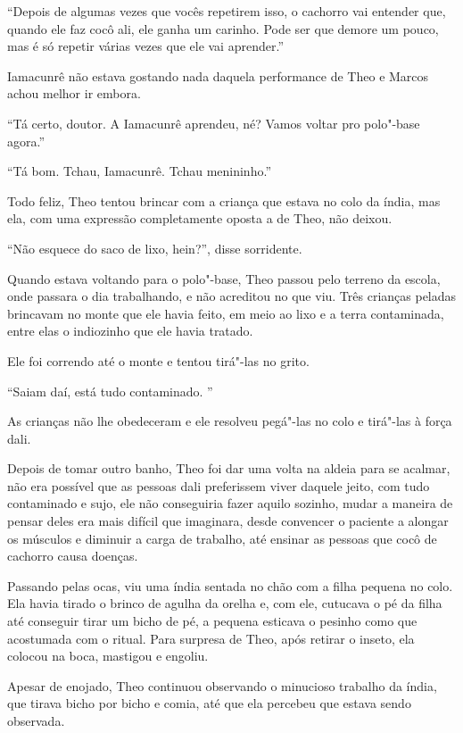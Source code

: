 ``Depois de algumas vezes que vocês repetirem isso, o cachorro vai
entender que, quando ele faz cocô ali, ele ganha um carinho. Pode ser
que demore um pouco, mas é só repetir várias vezes que ele vai
aprender.''

Iamacunrê não estava gostando nada daquela performance de Theo e Marcos
achou melhor ir embora.

``Tá certo, doutor. A Iamacunrê aprendeu, né? Vamos voltar pro polo"-base
agora.''

``Tá bom. Tchau, Iamacunrê. Tchau menininho.''

Todo feliz, Theo tentou brincar com a criança que estava no colo da
índia, mas ela, com uma expressão completamente oposta a de Theo, não
deixou.

``Não esquece do saco de lixo, hein?'', disse sorridente.

Quando estava voltando para o polo"-base, Theo passou pelo terreno da
escola, onde passara o dia trabalhando, e não acreditou no que viu. Três
crianças peladas brincavam no monte que ele havia feito, em meio ao lixo
e a terra contaminada, entre elas o indiozinho que ele havia tratado.

Ele foi correndo até o monte e tentou tirá"-las no grito.

``Saiam daí, está tudo contaminado. ''

As crianças não lhe obedeceram e ele resolveu pegá"-las no colo e
tirá"-las à força dali.

\asterisc


Depois de tomar outro banho, Theo foi dar uma volta na aldeia para se
acalmar, não era possível que as pessoas dali preferissem viver daquele
jeito, com tudo contaminado e sujo, ele não conseguiria fazer aquilo
sozinho, mudar a maneira de pensar deles era mais difícil que imaginara,
desde convencer o paciente a alongar os músculos e diminuir a carga de
trabalho, até ensinar as pessoas que cocô de cachorro causa doenças.

Passando pelas ocas, viu uma índia sentada no chão com a filha pequena
no colo. Ela havia tirado o brinco de agulha da orelha e, com ele,
cutucava o pé da filha até conseguir tirar um bicho de pé, a pequena
esticava o pesinho como que acostumada com o ritual. Para surpresa de
Theo, após retirar o inseto, ela colocou na boca, mastigou e engoliu.

Apesar de enojado, Theo continuou observando o minucioso trabalho da
índia, que tirava bicho por bicho e comia, até que ela percebeu que
estava sendo observada.

